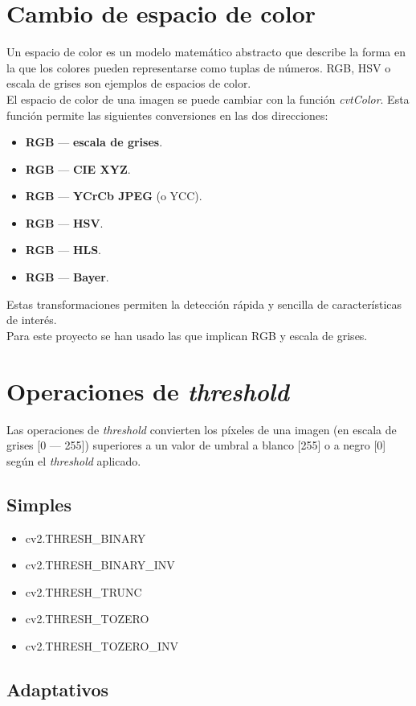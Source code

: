\section{Cambio de espacio de color}
Un espacio de color es un modelo matemático abstracto que describe 
la forma en la que los colores pueden representarse como tuplas de 
números. RGB, HSV o escala de grises son ejemplos de espacios de color. \\
El espacio de color de una imagen se puede cambiar con la función \emph{cvtColor}.
Esta función permite las siguientes conversiones en las dos direcciones:
\begin{itemize}
\item  \textbf{RGB} --- \textbf{escala de grises}.
\item  \textbf{RGB} --- \textbf{CIE XYZ}.
\item  \textbf{RGB} --- \textbf{YCrCb JPEG} (o YCC).
\item  \textbf{RGB} --- \textbf{HSV}.
\item  \textbf{RGB} --- \textbf{HLS}.
\item  \textbf{RGB} --- \textbf{Bayer}.
\end{itemize}
Estas transformaciones permiten la detección rápida y sencilla de características
de interés. \\
Para este proyecto se han usado las que implican RGB y escala de grises.

\section{Operaciones de \emph{threshold}}
Las operaciones de \emph{threshold} convierten los píxeles de una
imagen (en escala de grises [0 --- 255]) superiores a un valor de
umbral a blanco [255] o a negro [0] según el \emph{threshold} aplicado.
\subsection{Simples}
\begin{itemize}
\item cv2.THRESH\_BINARY
\item cv2.THRESH\_BINARY\_INV
\item cv2.THRESH\_TRUNC
\item cv2.THRESH\_TOZERO
\item cv2.THRESH\_TOZERO\_INV
\end{itemize}
\subsection{Adaptativos}
